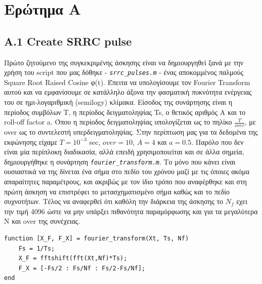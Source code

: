 \documentclass[11pt]{article}
\begin{document}
    \section*{Ερώτημα Α}
    
    \subsection*{A.1 Create SRRC pulse}
    Πρώτο ζητούμενο της συγκεκριμένης άσκησης είναι να δημιουργηθεί ξανά με την χρήση του script που μας δόθηκε - \emph{\texttt{srrc\_pulses.m}} - ένας αποκομμένος παλμούς Square Root Raised Cosine φ(t). Έπειτα να υπολογίσουμε τον Fourier Transform αυτού και να εμφανίσουμε σε κατάλληλο άξονα την φασματική πυκνότητα ενέργειας του σε ημι-λογαριθμική (semilogy) κλίμακα. Είσοδος της συνάρτησης είναι η περίοδος συμβόλων T, η περίοδος δειγματοληψίας Ts, ο θετικός αριθμός Α και το roll-off factor a. Όπου η περίοδος δειγματοληψίας υπολογίζεται ως το πηλίκο $\frac{T}{over}$, με over ως το συντελεστή υπερδειγματοληψίας. Στην περίπτωση μας για τα δεδομένα της εκφώνησης είχαμε $T = {10^{−3}}$ sec, $over = 10$, $A = 4$ και $a = 0.5$. Παρόλο που δεν είναι μία περίπλοκη διαδικασία, αλλά επειδή χρησιμοποιείται και σε άλλα σημεία, δημιουργήθηκε η συνάρτηση \emph{\texttt{fourier\_transform.m}}. Το μόνο που κάνει είναι ουσιαστικά να της δίνεται ένα σήμα στο πεδίο του χρόνου μαζί με τις όποιες ακόμα απαραίτητες παραμέτρους, και ακριβώς με τον ίδιο τρόπο που αναφέρθηκε και στη πρώτη άσκηση να επιστρέφει το μετασχηματισμένο σήμα καθώς και το πεδίο συχνοτήτων. Τέλος να αναφερθεί ότι καθόλη την διάρκεια της άσκησης το $N_f$ εχει την τιμή 4096 ώστε να μην υπάρξει πιθανότητα παραμόρφωσης και για τα μεγαλύτερα N και over της συνέχειας. 
    
    \begin{lstlisting}[caption = {\emph{\texttt{fourier\_transform.m}}}]
function [X_F, F_X] = fourier_transform(Xt, Ts, Nf)
    Fs = 1/Ts;
    X_F = fftshift(fft(Xt,Nf)*Ts);
    F_X = [-Fs/2 : Fs/Nf : Fs/2-Fs/Nf];
end
    \end{lstlisting}
    
\end{document}
